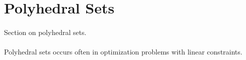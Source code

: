 \section{Polyhedral Sets}
\label{sect:015}
\paragraph{}Section on polyhedral sets.
\paragraph{}Polyhedral sets occurs often in optimization problems with linear constraints.


